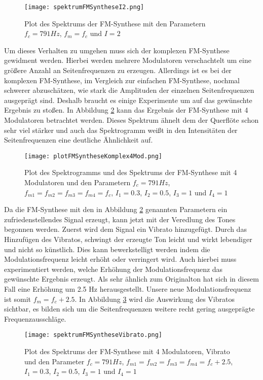 \begin{figure} [ht]
\centering
  \texttt{[image: spektrumFMSyntheseI2.png]}
\caption{Plot des Spektrums der FM-Synthese mit den Parametern $f_c = 791 Hz$, $f_m = f_c$ und $I = 2$}
\label{fig:spektrumFMSyntheseI2}
\end{figure}

Um dieses Verhalten zu umgehen muss sich der komplexen FM-Synthese gewidment werden. Hierbei werden mehrere Modulatoren verschachtelt um eine größere Anzahl an Seitenfrequenzen zu erzeugen. Allerdings ist es bei der komplexen FM-Synthese, im Vergleich zur einfachen FM-Synthese, nochmal schwerer abzuschätzen, wie stark die Amplituden der einzelnen Seitenfrequenzen ausgeprägt sind. Deshalb braucht es einige Experimente um auf das gewünschte Ergebnis zu stoßen. In Abbildung \ref{fig:plotFMSyntheseKomplex4Mod} kann das Ergebnis der FM-Synthese mit 4 Modulatoren betrachtet werden. Dieses Spektrum ähnelt dem der Querflöte schon sehr viel stärker und auch das Spektrogramm weißt in den Intensitäten der Seitenfrequenzen eine deutliche Ähnlichkeit auf.

\begin{figure} [ht]
\centering
  \texttt{[image: plotFMSyntheseKomplex4Mod.png]}
\caption{Plot des Spektrogramms und des Spektrums der FM-Synthese mit 4 Modulatoren und den Parametern $f_c = 791 Hz$, $f_{m1} = f_{m2} = f_{m3} = f_{m4} = f_c$, $I_1 = 0.3$, $I_2 = 0.5$, $I_3 = 1$ und $I_4 = 1$}
\label{fig:plotFMSyntheseKomplex4Mod}
\end{figure}

Da die FM-Synthese mit den in Abbildung \ref{fig:plotFMSyntheseKomplex4Mod} genannten Parametern ein zufriedenstellendes Signal erzeugt, kann jetzt mit der Veredlung des Tones begonnen werden. Zuerst wird dem Signal ein Vibrato hinzugefügt. Durch das Hinzufügen des Vibratos, schwingt der erzeugte Ton leicht und wirkt lebendiger und nicht so künstlich. Dies kann bewerkstelligt werden indem die Modulationsfrequenz leicht erhöht oder verringert wird. Auch hierbei muss experimentiert werden, welche Erhöhung der Modulationsfrequenz das gewünschte Ergebnis erzeugt. Als sehr ähnlich zum Originalton hat sich in diesem Fall eine Erhöhung um 2.5 Hz herausgestellt. Unsere neue Modulationsfrequenz ist somit $f_m = f_c + 2.5$. In Abbildung \ref{fig:spektrumFMSyntheseVibrato} wird die Auswirkung des Vibratos sichtbar, es bilden sich um die Seitenfrequenzen weitere recht gering ausgeprägte Frequenzausschläge.

\begin{figure} [ht]
\centering
  \texttt{[image: spektrumFMSyntheseVibrato.png]}
\caption{Plot des Spektrums der FM-Synthese mit 4 Modulatoren, Vibrato und den Parameter $f_c = 791 Hz$, $f_{m1} = f_{m2} = f_{m3} = f_{m4} = f_c + 2.5$, $I_1 = 0.3$, $I_2 = 0.5$, $I_3 = 1$ und $I_4 = 1$}
\label{fig:spektrumFMSyntheseVibrato}
\end{figure}

